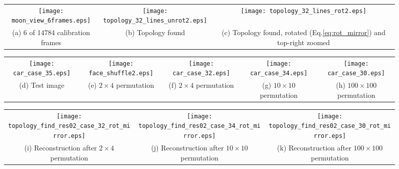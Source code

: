 \begin{figure}[t]
\centering
\begin{tabular}{ccc}
\texttt{[image: moon\_view\_6frames.eps]} &
\texttt{[image: topology\_32\_lines\_unrot2.eps]} & 
\texttt{[image: topology\_32\_lines\_rot2.eps]} \\
\parbox{3cm}{\centering \small (a) 6 of 14784 calibration frames} &
\parbox{3cm}{\centering \small (b) Topology found} & 
\parbox{5cm}{\centering \small (c) Topology found, rotated (Eq.\ref{eq:rot_mirror}) and top-right zoomed} %
\vspace{3mm} \\
\end{tabular}
%
\begin{tabular}{ccccc}
\texttt{[image: car\_case\_35.eps]} & 
\texttt{[image: face\_shuffle2.eps]} &
\texttt{[image: car\_case\_32.eps]} & 
\texttt{[image: car\_case\_34.eps]} & 
\texttt{[image: car\_case\_30.eps]} \\
\parbox{2cm}{\centering \small (d) Test image} &
\parbox{2cm}{\centering \small (e) $2 \times 4$ permutation} &
\parbox{2cm}{\centering \small (f) $2 \times 4$ permutation} &
\parbox{2cm}{\centering \small (g) $10 \times 10$ permutation} &
\parbox{2cm}{\centering \small (h) $100 \times 100$ permutation} %
\vspace{3mm} \\
\end{tabular}
%
\begin{tabular}{ccc}
\texttt{[image: topology\_find\_res02\_case\_32\_rot\_mirror.eps]} & 
\texttt{[image: topology\_find\_res02\_case\_34\_rot\_mirror.eps]} & 
\texttt{[image: topology\_find\_res02\_case\_30\_rot\_mirror.eps]} \\
\parbox{3.0cm}{\centering \small (i) Reconstruction after $2 \times 4$ permutation} &
\parbox{3.0cm}{\centering \small (j) Reconstruction after $10 \times 10$ permutation} &
\parbox{3.2cm}{\centering \small (k) Reconstruction after $100 \times 100$ permutation} %

\end{tabular}
\end{figure}
